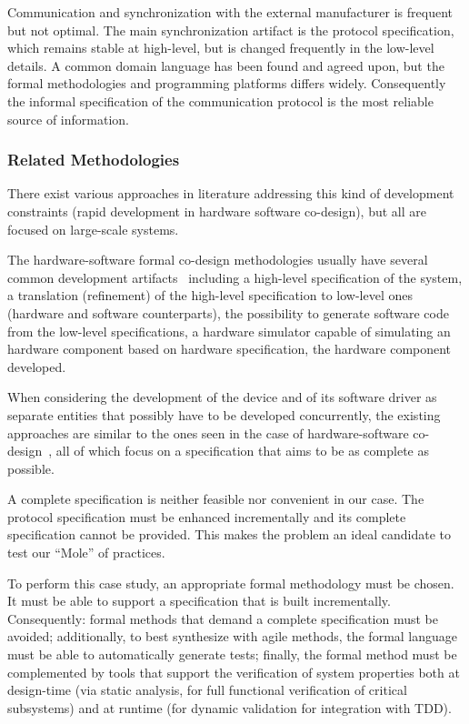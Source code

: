 \documentclass[english]{lni}
\begin{document}
Communication and synchronization with the external manufacturer is frequent but not optimal.  
The main synchronization artifact is the protocol specification, which remains stable at high-level, but is changed frequently in the low-level details.  
A common domain language has been found and agreed upon, but the formal methodologies and programming platforms differs widely.  
Consequently the informal specification of the communication protocol is the most reliable source of information.



\subsubsection{Related Methodologies}
\label{sec:relat-meth}

There exist various approaches in literature addressing this kind of development constraints (rapid development in hardware software co-design), but all are focused on large-scale systems.  

The hardware-software formal co-design methodologies usually have several common development artifacts~\cite{Slomka2000, Hoffman2001} including a high-level specification of the system, a translation (refinement) of the high-level specification to low-level ones (hardware and software counterparts), the possibility to generate software code from the low-level specifications, a hardware simulator capable of simulating an hardware component based on hardware specification, the hardware component developed.

When considering the development of the device and of its software driver as separate entities that possibly have to be developed concurrently, the existing approaches are similar to the ones seen in the case of hardware-software co-design~\cite{Valderrama1995,Siegmund2002,Ryzhyk2009}, all of which focus on a specification that aims to be as complete as possible.

A complete specification is neither feasible nor convenient in our case. 
The protocol specification must be enhanced incrementally and its complete specification cannot be provided.  
This makes the problem an ideal candidate to test our ``Mole'' of practices.

To perform this case study, an appropriate formal methodology must be chosen.  
It must be able to support a specification that is built incrementally.  
Consequently: formal methods that demand a complete specification must be avoided; additionally, to best synthesize with agile methods, the formal language must be able to automatically generate tests; finally, the formal method must be complemented by tools that support the verification of system properties both at design-time (via static analysis, for full functional verification of critical subsystems) and at runtime (for dynamic validation for integration with TDD).
\end{document}
